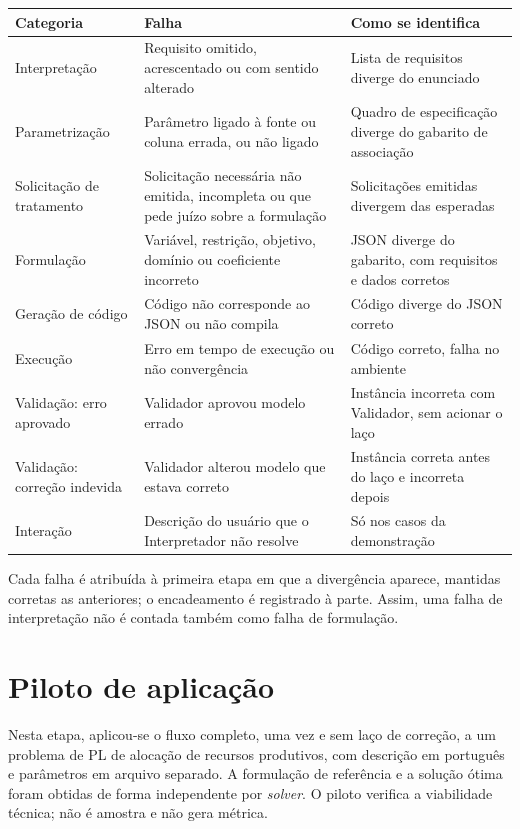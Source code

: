 \begin{quadro}[htbp]
\caption{Taxonomia dos modos de falha}
\label{q:taxonomia}
\centering
\small
\begin{tabularx}{\textwidth}{@{}l X X@{}}
\toprule
Categoria & Falha & Como se identifica \\
\midrule
Interpretação & Requisito omitido, acrescentado ou com sentido alterado & Lista de requisitos diverge do enunciado \\
Parametrização & Parâmetro ligado à fonte ou coluna errada, ou não ligado & Quadro de especificação diverge do gabarito de associação \\
Solicitação de tratamento & Solicitação necessária não emitida, incompleta ou que pede juízo sobre a formulação & Solicitações emitidas divergem das esperadas \\
Formulação & Variável, restrição, objetivo, domínio ou coeficiente incorreto & JSON diverge do gabarito, com requisitos e dados corretos \\
Geração de código & Código não corresponde ao JSON ou não compila & Código diverge do JSON correto \\
Execução & Erro em tempo de execução ou não convergência & Código correto, falha no ambiente \\
Validação: erro aprovado & Validador aprovou modelo errado & Instância incorreta com Validador, sem acionar o laço \\
Validação: correção indevida & Validador alterou modelo que estava correto & Instância correta antes do laço e incorreta depois \\
Interação & Descrição do usuário que o Interpretador não resolve & Só nos casos da demonstração \\
\bottomrule
\end{tabularx}
\end{quadro}

Cada falha é atribuída à primeira etapa em que a divergência aparece, mantidas corretas as anteriores; o encadeamento é registrado à parte. Assim, uma falha de interpretação não é contada também como falha de formulação.

\section{Piloto de aplicação}
\label{sec:piloto}

Nesta etapa, aplicou-se o fluxo completo, uma vez e sem laço de correção, a um problema de PL de alocação de recursos produtivos, com descrição em português e parâmetros em arquivo separado. A formulação de referência e a solução ótima foram obtidas de forma independente por \textit{solver}. O piloto verifica a viabilidade técnica; não é amostra e não gera métrica.

